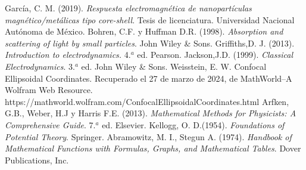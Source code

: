 \documentclass[paper=letter, fontsize=12pt,]{article}
\begin{document}
\begin{thebibliography}{99}
 García, C. M. (2019). \textit{Respuesta electromagnética de nanopartículas magnético/metálicas tipo core-shell}. Tesis de licenciatura. Universidad Nacional Autónoma de México.
Bohren, C.F. y  Huffman D.R.  (1998). \textit{Absorption and scattering of light by small particles}. John Wiley \& Sons.
Griffiths,D. J.  (2013). \textit{Introduction to electrodynamics.} 4.$^a$ ed. Pearson.
Jackson,J.D.  (1999). \textit{Classical Electrodynamics}. 3.$^a$ ed.  John Wiley \& Sons.
 Weisstein, E. W. Confocal Ellipsoidal Coordinates. Recuperado el 27 de marzo de 2024, de MathWorld--A Wolfram Web Resource. https://mathworld.wolfram.com/ConfocalEllipsoidalCoordinates.html
 Arfken, G.B., Weber, H.J y Harris F.E. (2013). \textit{Mathematical Methods for Physicists: A Comprehensive Guide}. 7.$^a$ ed. Elsevier.
 Kellogg, O. D.(1954). \textit{Foundations of Potential Theory}. Springer.
 Abramowitz, M. I., Stegun A. (1974). \textit{Handbook of Mathematical Functions with Formulas, Graphs, and
Mathematical Tables}. Dover Publications, Inc.
\end{thebibliography}

\end{document}
